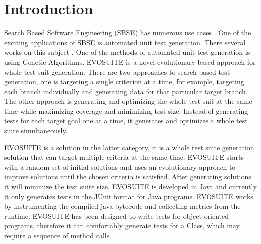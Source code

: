 \documentclass[sigconf]{acmart}
\begin{document}



\maketitle

\section{Introduction}
Search Based Software Engineering (SBSE) has numerous use cases \cite{10.1145/2379776.2379787,Harman2012}.
One of the exciting applications of SBSE is automated unit test generation. There several works on this
subject \cite{57624,6004309,10.1145/1276958.1277172,10.1145/1013886.1007528}. One of the methods of automated
unit test generation is using Genetic Algorithms. EVOSUITE \cite{6004309} is 
a novel evolutionary based approach for whole test suit generation. There are two approaches to search 
based test generation, one is targeting a single criterion at a time, for example, targeting each branch
individually and generating data for that particular target branch. The other approach is generating and 
optimizing the whole test suit at the same time while maximizing coverage and minimizing test size. 
Instead of generating tests for each target goal one at a time, it generates and optimizes a whole test suite 
simultaneously. 

EVOSUITE is a solution in the latter category, it is a whole test suite generation solution that can
target multiple criteria at the same time. EVOSUITE starts with a random set of initial solutions and uses 
an evolutionary approach to improve solutions until the chosen criteria is satisfied.
After generating solutions it will minimize the test suite size. EVOSUITE is developed in Java and currently 
it only generates tests in the JUnit format for Java programs. EVOSUITE works by instrumenting the compiled 
java bytecode and collecting metrics from the runtime. EVOSUITE has been designed to write tests 
for object-oriented programs, therefore it can comfortably generate tests for a Class, 
which may require a sequence of method calls. 
\end{document}
